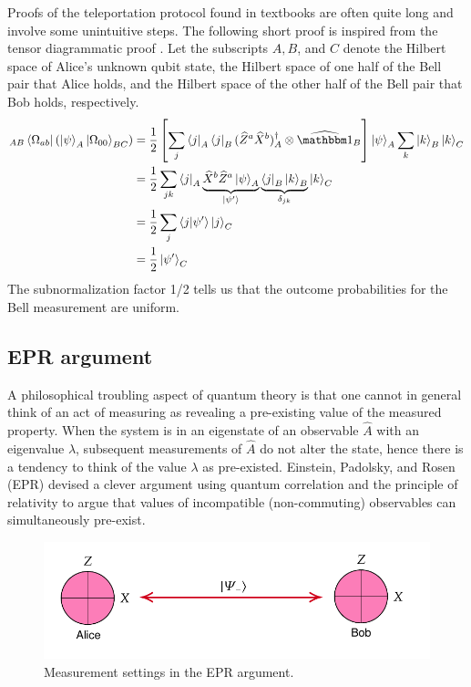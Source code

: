 Proofs of the teleportation protocol found in textbooks are often quite long and involve some unintuitive steps. The following short proof is inspired from the tensor diagrammatic proof \cite{coecke2009}.
Let the subscripts $A,B$, and $C$ denote the Hilbert space of Alice's unknown qubit state, the Hilbert space of one half of the Bell pair that Alice holds, and the Hilbert space of the other half of the Bell pair that Bob holds, respectively.  
	\begin{align}
		{}_{AB}\bra{\Omega_{ab}} \left(\ket{\psi}_A \ket{\Omega_{00}}_{BC}\right)
		&= \frac{1}{2} \left[\sum_j \bra{j}_A \bra{j}_B(\op Z^a \op X^b)_A\dgg \otimes \op \id_B\right] \ket{\psi}_A \sum_k \ket{k}_B \ket{k}_C \\
		&= \frac{1}{2} \sum_{jk} \bra{j}_A\underbrace{\op X^b \op Z^a \ket{\psi}_A}_{\ket{\psi'}} \underbrace{\bra{j}_B\ket{k}_B}_{\delta_{jk}} \ket{k}_C\\
		&= \frac{1}{2} \sum_j \braket{j}{\psi'} \ket{j}_C\\
		&= \frac{1}{2} \ket{\psi'}_C
	\end{align}
	The subnormalization factor 1/2 tells us that the outcome probabilities for the Bell measurement are uniform.


\subsection{EPR argument}

A philosophical troubling aspect of quantum theory is that one cannot in general think of an act of measuring as revealing a pre-existing value of the measured property. When the system is in an eigenstate of an observable $\hat A$ with an eigenvalue $\lambda$, subsequent measurements of $\hat A$
do not alter the state, hence there is a tendency to think of the value $\lambda$ as pre-existed. Einstein, Padolsky, and Rosen (EPR) devised a clever argument using quantum correlation and the principle of relativity to argue that values of incompatible (non-commuting) observables can simultaneously pre-exist.
\begin{figure}[h]
	\centering
	\includegraphics[scale=0.75]{fig/epr-measurement-setting}
	\caption{Measurement settings in the EPR argument.}
	\label{fig:epr-setting}
\end{figure}

